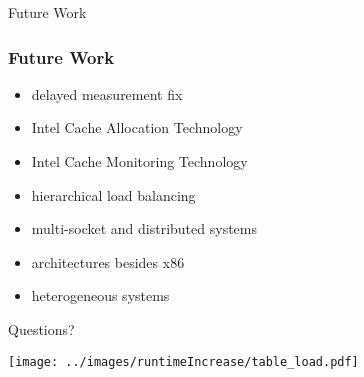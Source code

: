 \documentclass[utf8,10pt,aspectratio=169]{beamer}
\begin{document}
\begin{frame}
  \centering
  \Large
  Future Work
\end{frame}

\begin{frame}
  \frametitle{Future Work}
  \centering
  \begin{itemize}
  \setlength{\itemsep}{6pt}
    \item delayed measurement fix
    \item Intel Cache Allocation Technology
    \item Intel Cache Monitoring Technology
    \item hierarchical load balancing
    \item multi-socket and distributed systems
    \item architectures besides x86
    \item heterogeneous systems
  \end{itemize}
\end{frame}


\begin{frame}
  \centering
  \Large
  Questions?
\end{frame}




\begin{frame}
  \centering
  \texttt{[image: ../images/runtimeIncrease/table\_load.pdf]}
\end{frame}
\end{document}
